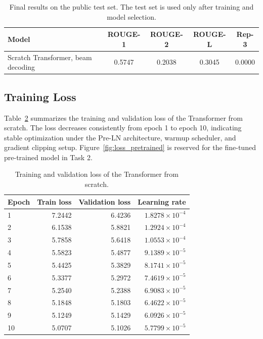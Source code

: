 \documentclass[conference]{IEEEtran}
\begin{document}
\begin{table}[htbp]
\centering
\caption{Final results on the public test set. The test set is used only after training and model selection.}
\label{tab:test_results}
\begin{tabular}{lcccc}
\toprule
Model & ROUGE-1 & ROUGE-2 & ROUGE-L & Rep-3 \\
\midrule
Scratch Transformer, beam decoding & 0.5747 & 0.2038 & 0.3045 & 0.0000 \\
\bottomrule
\end{tabular}
\end{table}

\subsection{Training Loss}
Table~\ref{tab:loss_scratch} summarizes the training and validation loss of the Transformer from scratch. The loss decreases consistently from epoch 1 to epoch 10, indicating stable optimization under the Pre-LN architecture, warmup scheduler, and gradient clipping setup. Figure~\ref{fig:loss_pretrained} is reserved for the fine-tuned pre-trained model in Task 2.

\begin{table}[htbp]
\centering
\caption{Training and validation loss of the Transformer from scratch.}
\label{tab:loss_scratch}
\begin{tabular}{lrrr}
\toprule
Epoch & Train loss & Validation loss & Learning rate \\
\midrule
1 & 7.2442 & 6.4236 & $1.8278 \times 10^{-4}$ \\
2 & 6.1538 & 5.8821 & $1.2924 \times 10^{-4}$ \\
3 & 5.7858 & 5.6418 & $1.0553 \times 10^{-4}$ \\
4 & 5.5823 & 5.4877 & $9.1389 \times 10^{-5}$ \\
5 & 5.4425 & 5.3829 & $8.1741 \times 10^{-5}$ \\
6 & 5.3377 & 5.2972 & $7.4619 \times 10^{-5}$ \\
7 & 5.2540 & 5.2388 & $6.9083 \times 10^{-5}$ \\
8 & 5.1848 & 5.1803 & $6.4622 \times 10^{-5}$ \\
9 & 5.1249 & 5.1429 & $6.0926 \times 10^{-5}$ \\
10 & 5.0707 & 5.1026 & $5.7799 \times 10^{-5}$ \\
\bottomrule
\end{tabular}
\end{table}
\end{document}
